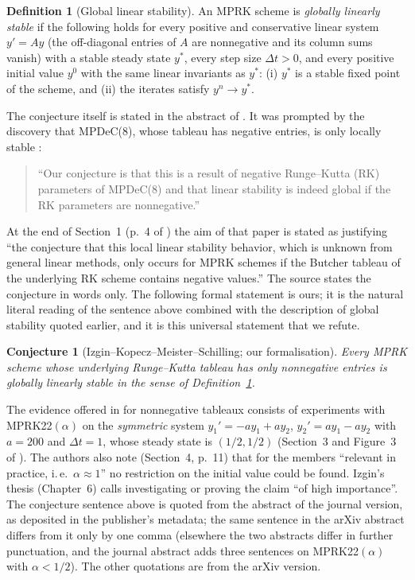 \documentclass[11pt,a4paper]{article}
\theoremstyle{plain}
\newtheorem{conjecture}[theorem]{Conjecture}
\theoremstyle{definition}
\newtheorem{definition}[theorem]{Definition}
\begin{document}
\begin{definition}[Global linear stability]\label{def:global}
An MPRK scheme is \emph{globally linearly stable} if the following holds for every positive and conservative linear system $y'=Ay$ (the off-diagonal entries of $A$ are nonnegative and its column sums vanish) with a stable steady state $y^*$, every step size $\Delta t>0$, and every positive initial value $y^0$ with the same linear invariants as $y^*$: (i) $y^*$ is a stable fixed point of the scheme, and (ii) the iterates satisfy $y^n\to y^*$.
\end{definition}

The conjecture itself is stated in the abstract of \cite{IKMS2024}. It was prompted by the discovery that MPDeC(8), whose tableau has negative entries, is only locally stable \cite{IO2023}:
\begin{quote}\small
``Our conjecture is that this is a result of negative Runge--Kutta (RK) parameters of MPDeC(8) and that linear stability is indeed global if the RK parameters are nonnegative.''
\end{quote}
At the end of Section~1 (p.~4 of \cite{IKMS2023arxiv}) the aim of that paper is stated as justifying ``the conjecture that this local linear stability behavior, which is unknown from general linear methods, only occurs for MPRK schemes if the Butcher tableau of the underlying RK scheme contains negative values.'' The source states the conjecture in words only. The following formal statement is ours; it is the natural literal reading of the sentence above combined with the description of global stability quoted earlier, and it is this universal statement that we refute.

\begin{conjecture}[Izgin--Kopecz--Meister--Schilling; our formalisation]\label{conj:IKMS}
Every MPRK scheme whose underlying Runge--Kutta tableau has only nonnegative entries is globally linearly stable in the sense of Definition~\ref{def:global}.
\end{conjecture}

The evidence offered in \cite{IKMS2024} for nonnegative tableaux consists of experiments with MPRK22$(\alpha)$ on the \emph{symmetric} system $y_1'=-ay_1+ay_2$, $y_2'=ay_1-ay_2$ with $a=200$ and $\Delta t=1$, whose steady state is $(1/2,1/2)$ (Section~3 and Figure~3 of \cite{IKMS2023arxiv}). The authors also note (Section~4, p.~11) that for the members ``relevant in practice, i.\,e.\ $\alpha\approx1$'' no restriction on the initial value could be found. Izgin's thesis \cite{Izgin2024thesis} (Chapter~6) calls investigating or proving the claim ``of high importance''. The conjecture sentence above is quoted from the abstract of the journal version, as deposited in the publisher's metadata; the same sentence in the arXiv abstract differs from it only by one comma (elsewhere the two abstracts differ in further punctuation, and the journal abstract adds three sentences on MPRK22$(\alpha)$ with $\alpha<1/2$). The other quotations are from the arXiv version.
\end{document}
